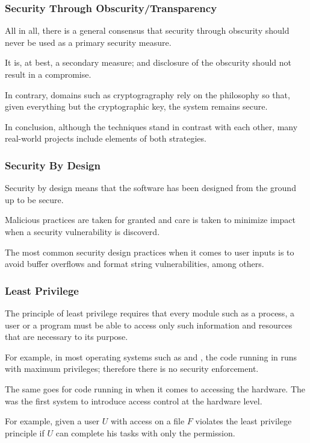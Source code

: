 
\begin{frame}
  \frametitle{Security Through Obscurity/Transparency}

  All in all, there is a general consensus that security through obscurity
  should never be used as a primary security measure.

  \-

  It is, at best, a secondary measure; and disclosure of the obscurity should
  not result in a compromise.

  \-

  In contrary, domains such as cryptogragraphy rely on the
   philosophy so that, given everything but the
  cryptographic key, the system remains secure.

  \-

  In conclusion, although the techniques stand in contrast with each other,
  many real-world projects include elements of both strategies.
\end{frame}


\begin{frame}
  \frametitle{Security By Design}

  Security by design means that the software has been designed from the ground
  up to be secure.

  \-

  Malicious practices are taken for granted and care is taken to minimize
  impact when a security vulnerability is discoverd.

  \-

  The most common security design practices when it comes to user inputs is
  to avoid buffer overflows and format string vulnerabilities, among others.
\end{frame}


\begin{frame}
  \frametitle{Least Privilege}

  The principle of least privilege requires that every module such as a
  process, a user or a program must be able to access only such information
  and resources that are necessary to its purpose.

  \-

  For example, in most operating systems such as  and
  , the code running in  runs with maximum
  privileges; therefore there is no security enforcement.

  \-

  The same goes for code running in  when it comes to
  accessing the hardware. The  was the first system
  to introduce access control at the hardware level.

  \-

  For example, given a user $U$ with  access on a file
  $F$ violates the least privilege principle if $U$ can complete his
  tasks with only the  permission.
\end{frame}

